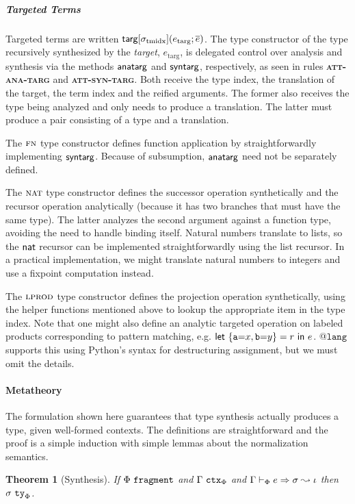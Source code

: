 \documentclass[9pt,preprint]{sigplanconf}
\newcommand{\sigmat}[1]{\sigma_{\text{#1}}}
\newcommand{\FF}[1]{{\sf #1}}
\newtheorem{theorem}{Theorem}
\newcommand{\rulename}[1]{{\textsc{\textbf{#1}}}}
\begin{document}
\subparagraph{Targeted Terms} Targeted terms are written $\FF{targ}[\sigmat{tmidx}](e_\text{targ}; \overline{e})$. The type constructor of the type recursively synthesized by the \emph{target}, $e_\text{targ}$, is delegated control over analysis and synthesis via the methods $\FF{anatarg}$ and $\FF{syntarg}$, respectively, as seen in rules \rulename{att-ana-targ} and \rulename{att-syn-targ}. Both receive the type index, the translation of the target, the term index and the reified arguments. The former also receives the type being analyzed and only needs to produce a translation. The latter must produce a pair consisting of a type and a translation.

The $\textsc{fn}$ type constructor defines function application by straightforwardly implementing $\FF{syntarg}$.  Because of subsumption, $\FF{anatarg}$ need not be separately defined.

The $\textsc{nat}$ type constructor defines the successor operation synthetically and the recursor operation analytically (because it has two branches that must have the same type). The latter analyzes the second argument against a function type, avoiding the need to handle binding itself. Natural numbers translate to lists, so the $\FF{nat}$ recursor can be implemented straightforwardly using the list recursor. In a practical implementation, we might translate natural numbers to integers and use a fixpoint computation instead.

The $\textsc{lprod}$ type constructor defines the projection operation synthetically, using the helper functions mentioned above to lookup the appropriate item in the type index. Note that one might also define an analytic targeted operation on labeled products corresponding to pattern matching, e.g. $\FF{let}~\{\texttt{a}{=}x, \texttt{b}{=}y\}=r~\FF{in}~e$. @$\texttt{lang}$ supports this using Python's syntax for destructuring assignment, but we must omit the details.

\paragraph{Metatheory} The formulation shown here guarantees that type synthesis actually produces a type, given well-formed contexts. The definitions are straightforward and the proof is a simple induction with simple lemmas about the normalization semantics. %

\begin{theorem}[Synthesis]
If $\Phi~\mathtt{fragment}$ and $\Gamma~\mathtt{ctx}_\Phi$ and $\Gamma \vdash_\Phi e \Rightarrow \sigma \leadsto \iota$ then $\sigma~\mathtt{ty}_\Phi$.
\end{theorem}
\end{document}
